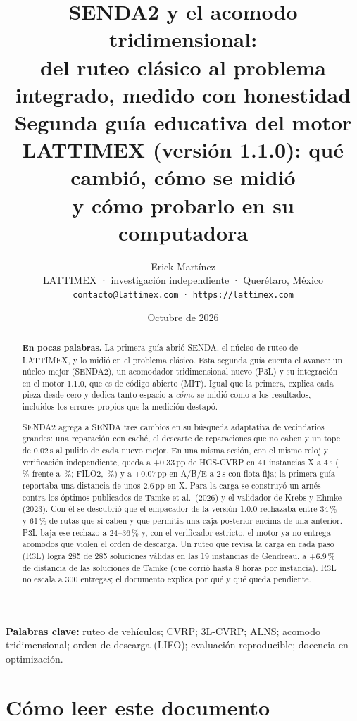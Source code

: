\documentclass[11pt,a4paper]{article}
\title{\textbf{SENDA2 y el acomodo tridimensional:\\ del ruteo clásico al problema integrado, medido con honestidad}\\[0.4em]
\large Segunda guía educativa del motor LATTIMEX (versión 1.1.0): qué cambió, cómo se midió\\ y cómo probarlo en su computadora}
\author{Erick Martínez\\
\small LATTIMEX · investigación independiente · Querétaro, México\\
\small \texttt{contacto@lattimex.com} · \texttt{https://lattimex.com}}
\date{Octubre de 2026}
\newcommand{\senda}{SENDA}
\newcommand{\sendados}{SENDA2}
\newcommand{\pp}{\,pp}
\begin{document}
\maketitle
\thispagestyle{licenciaguia}

\begin{abstract}
\noindent\textbf{En pocas palabras.} La primera guía abrió \senda, el núcleo de ruteo de LATTIMEX, y
lo midió en el problema clásico. Esta segunda guía cuenta el avance: un núcleo mejor (\sendados), un
acomodador tridimensional nuevo (P3L) y su integración en el motor 1.1.0, que es de código abierto
(MIT). Igual que la primera, explica cada pieza desde cero y dedica tanto espacio a \emph{cómo} se
midió como a los resultados, incluidos los errores propios que la medición destapó.

\smallskip
\noindent \sendados{} agrega a \senda{} tres cambios en su búsqueda adaptativa de vecindarios grandes:
una reparación con caché, el descarte de reparaciones que no caben y un tope de 0.02\,s al pulido de
cada nuevo mejor. En una misma sesión, con el mismo reloj y verificación independiente, queda a
+0.33\pp{} de HGS-CVRP en 41 instancias X a 4\,s (\SendaDosX\,\% frente a \HgsX\,\%; FILO2,
\FiloX\,\%) y a +0.07\pp{} en A/B/E a 2\,s con flota fija; la primera guía reportaba una distancia de
unos 2.6\pp{} en X. Para la carga se construyó un arnés contra los óptimos publicados de Tamke et al.\
(2026) y el validador de Krebs y Ehmke (2023). Con él se descubrió que el empacador de la versión 1.0.0
rechazaba entre 34\,\% y 61\,\% de rutas que sí caben y que permitía una caja posterior encima de una
anterior. P3L baja ese rechazo a 24--36\,\% y, con el verificador estricto, el motor ya no entrega
acomodos que violen el orden de descarga. Un ruteo que revisa la carga en cada paso (R3L) logra 285 de
285 soluciones válidas en las 19 instancias de Gendreau, a +6.9\,\% de distancia de las soluciones de
Tamke (que corrió hasta 8 horas por instancia). R3L no escala a 300 entregas; el documento explica por
qué y qué queda pendiente.
\end{abstract}

\noindent\textbf{Palabras clave:} ruteo de vehículos; CVRP; 3L-CVRP; ALNS; acomodo tridimensional;
orden de descarga (LIFO); evaluación reproducible; docencia en optimización.

\tableofcontents
\newpage

\section*{Cómo leer este documento}
\end{document}

